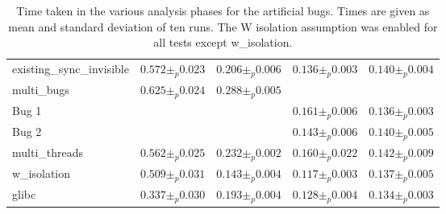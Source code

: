 \begin{sidewaystable}
{\begin{tabular}{|l|l|l|l|l|}
    existing\_sync\_invisible      & $0.572 \pm_p 0.023$ &  $0.206 \pm_p 0.006$ &  $0.136 \pm_p 0.003$ &  $0.140 \pm_p 0.004$\\
    multi\_bugs                    & $0.625 \pm_p 0.024$ &  $0.288 \pm_p 0.005$ & &  \\
    \hspace{5mm}Bug 1 & & &  $0.161 \pm_p 0.006$ &  $0.136 \pm_p 0.003$\\
    \hspace{5mm}Bug 2 & & &  $0.143 \pm_p 0.006$ &  $0.140 \pm_p 0.005$\\
    multi\_threads                 & $0.562 \pm_p 0.025$ &  $0.232 \pm_p 0.002$ &  $0.160 \pm_p 0.022$ &  $0.142 \pm_p 0.009$\\
    w\_isolation                   & $0.509 \pm_p 0.031$ &  $0.143 \pm_p 0.004$ &  $0.117 \pm_p 0.003$ &  $0.137 \pm_p 0.005$\\
    glibc                          & $0.337 \pm_p 0.030$ &  $0.193 \pm_p 0.004$ &  $0.128 \pm_p 0.004$ &  $0.134 \pm_p 0.003$\\
    \hline
  \end{tabular}
  }
  \caption{Time taken in the various analysis phases for the
    artificial bugs.  Times are given as mean and standard deviation
    of ten runs.  The W isolation assumption was enabled for all tests
    except w\_isolation.}
  \label{table:eval:summary_analysis_times}
\end{sidewaystable}

